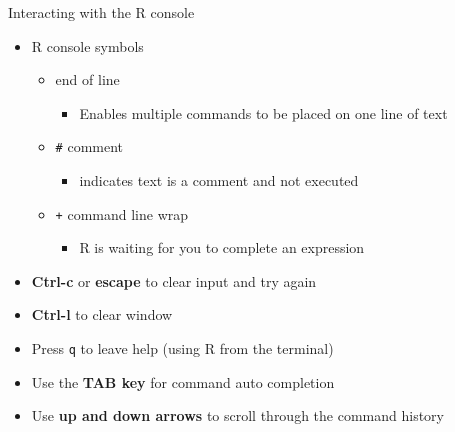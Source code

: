 \documentclass{beamer}
\begin{document}
\begin{frame}{Interacting with the R console}
    \begin{itemize}
        \item R console symbols
        \begin{itemize}
            \item {\tt \;} end of line
            \begin{itemize}
                \item Enables multiple commands to be placed on one line of text
            \end{itemize}
            \item {\tt \#} comment
            \begin{itemize}
                \item indicates text is a comment and not executed
            \end{itemize}
            \item {\tt +} command line wrap
            \begin{itemize}
                \item R is waiting for you to complete an expression
            \end{itemize}        \end{itemize}

        \item \textbf{Ctrl-c} or \textbf{escape} to clear input and try again
        \item \textbf{Ctrl-l} to clear window
        \item Press {\tt q} to leave help (using R from the terminal)
        \item Use the \textbf{TAB key} for command auto completion
        \item Use \textbf{up and down arrows} to scroll through the command history

    \end{itemize}
\end{frame}
\end{document}
